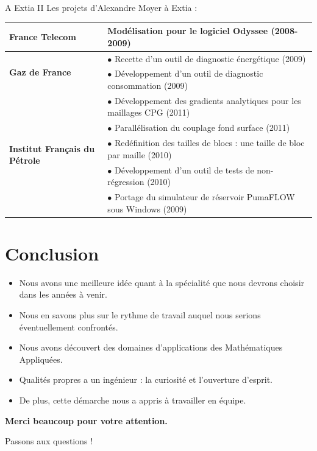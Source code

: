 \documentclass[xcolor=dvipsnames]{beamer}
\begin{document}
\begin{frame}{A Extia II}
Les projets d'Alexandre Moyer à Extia :

\hbox{}

\footnotesize
\begin{tabular}{| l | p{6.5cm} |}
\hline
\textbf{France Telecom} & Modélisation pour le logiciel Odyssee (2008-2009)\\\hline
\multirow{2}{*}{\textbf{Gaz de France}} & $\bullet$ Recette d'un outil de diagnostic énergétique (2009)\\
 & $\bullet$ Développement d'un outil de diagnostic consommation (2009)\\\hline
\multirow{5}{*}{\textbf{Institut Français du Pétrole}} & $\bullet$ Développement des gradients analytiques pour les maillages CPG (2011)\\
& $\bullet$ Parallélisation du couplage fond surface (2011)\\
& $\bullet$ Redéfinition des tailles de blocs : une taille de bloc par maille (2010)\\
& $\bullet$ Développement d'un outil de tests de non-régression (2010)\\
& $\bullet$ Portage du simulateur de réservoir PumaFLOW sous Windows (2009)\\\hline
\end{tabular}
\end{frame}


\section{Conclusion}
\begin{frame}
\begin{itemize}
    \item Nous avons une meilleure idée quant à la spécialité que nous devrons choisir dans
les années à venir.
	\item Nous en savons plus sur le rythme de travail auquel nous serions éventuellement
confrontés.
	\item Nous avons découvert des domaines d'applications des Mathématiques Appliquées.
	\item Qualités propres a un ingénieur : la curiosité et l'ouverture d'esprit.
	\item De plus, cette démarche nous a appris à travailler en équipe.
\end{itemize}
\end{frame}

\begin{frame}
\begin{center}

\LARGE
\textbf{Merci beaucoup pour votre attention.}

\hbox{}

\Large
Passons aux questions !

\end{center}
\end{frame}
\end{document}
